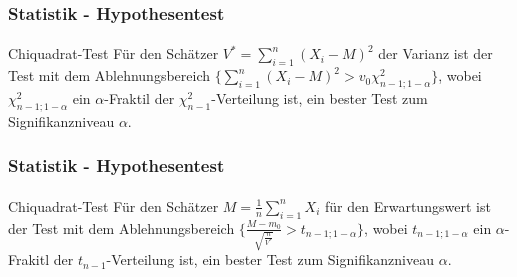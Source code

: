 \documentclass{beamer}
\begin{document}
\begin{frame}
    \frametitle{Statistik - Hypothesentest}
\framesubtitle{}

\begin{block}{Chiquadrat-Test}
Für den Schätzer $V^*= \sum_{i=1}^{n} (X_i - M)^2$ der Varianz 
ist der Test mit dem Ablehnungsbereich $\{ \sum_{i=1}^{n} (X_i - M)^2 > v_0 \chi^2_{n-1;1-\alpha} \}$, wobei $ \chi^2_{n-1;1-\alpha}$ ein $\alpha$-Fraktil der $\chi^2_{n-1}$-Verteilung ist,   ein bester Test zum Signifikanzniveau $\alpha$.
\end{block}
 \end{frame}


\begin{frame}
    \frametitle{Statistik - Hypothesentest}
\framesubtitle{}

\begin{block}{Chiquadrat-Test}
Für den Schätzer $M =  \frac{1}{n} \sum_{i= 1}^n X_i$ für den Erwartungswert 
ist der Test mit dem Ablehnungsbereich 
$\{ \frac{M -m_0}{\sqrt{\frac{n}{V^*}}}  >  t_{n-1; 1- \alpha} \}$,
 wobei $t_{n-1; 1- \alpha} $ ein $\alpha$-Frakitl der $t_{n-1}$-Verteilung ist,   ein bester Test zum Signifikanzniveau $\alpha$.
\end{block}
 \end{frame}
\end{document}
